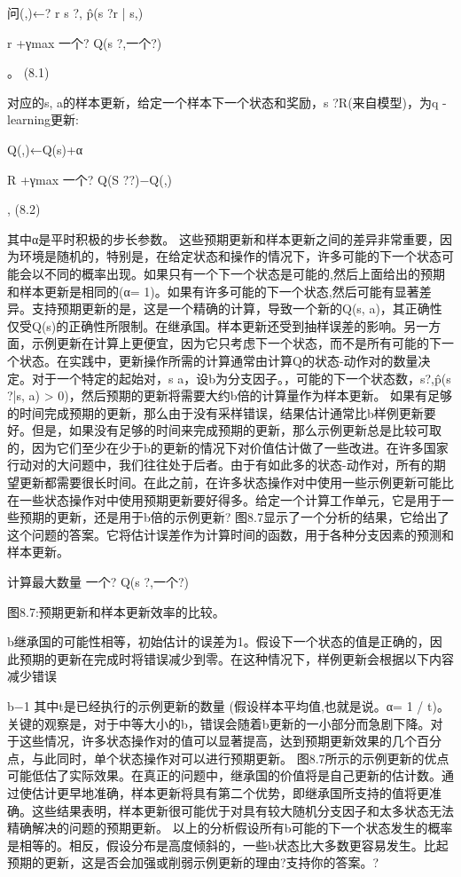 问(,)←?
r s ?,
p̂(s ?r | s,)

r +γmax
一个?
Q(s ?,一个?)

。 					(8.1)


对应的s, a的样本更新，给定一个样本下一个状态和奖励，s ?R(来自模型)，为q -learning更新:

Q(,)←Q(s)+α

R +γmax
一个?
Q(S ??)−Q(,)

, 					(8.2)

其中α是平时积极的步长参数。
这些预期更新和样本更新之间的差异非常重要，因为环境是随机的，特别是，在给定状态和操作的情况下，许多可能的下一个状态可能会以不同的概率出现。如果只有一个下一个状态是可能的,然后上面给出的预期和样本更新是相同的(α= 1)。如果有许多可能的下一个状态,然后可能有显著差异。支持预期更新的是，这是一个精确的计算，导致一个新的Q(s, a)，其正确性仅受Q(s)的正确性所限制。在继承国。样本更新还受到抽样误差的影响。另一方面，示例更新在计算上更便宜，因为它只考虑下一个状态，而不是所有可能的下一个状态。在实践中，更新操作所需的计算通常由计算Q的状态-动作对的数量决定。对于一个特定的起始对，s a，设b为分支因子。，可能的下一个状态数，s?,p̂(s ?|s, a) > 0)，然后预期的更新将需要大约b倍的计算量作为样本更新。
如果有足够的时间完成预期的更新，那么由于没有采样错误，结果估计通常比b样例更新要好。但是，如果没有足够的时间来完成预期的更新，那么示例更新总是比较可取的，因为它们至少在少于b的更新的情况下对价值估计做了一些改进。在许多国家行动对的大问题中，我们往往处于后者。由于有如此多的状态-动作对，所有的期望更新都需要很长时间。在此之前，在许多状态操作对中使用一些示例更新可能比在一些状态操作对中使用预期更新要好得多。给定一个计算工作单元，它是用于一些预期的更新，还是用于b倍的示例更新?
图8.7显示了一个分析的结果，它给出了这个问题的答案。它将估计误差作为计算时间的函数，用于各种分支因素的预测和样本更新。

计算最大数量
一个?
Q(s ?,一个?)

图8.7:预期更新和样本更新效率的比较。



b继承国的可能性相等，初始估计的误差为1。假设下一个状态的值是正确的，因此预期的更新在完成时将错误减少到零。在这种情况下，样例更新会根据以下内容减少错误

b−1
其中t是已经执行的示例更新的数量
(假设样本平均值,也就是说。α= 1 / t)。关键的观察是，对于中等大小的b，错误会随着b更新的一小部分而急剧下降。对于这些情况，许多状态操作对的值可以显著提高，达到预期更新效果的几个百分点，与此同时，单个状态操作对可以进行预期更新。
图8.7所示的示例更新的优点可能低估了实际效果。在真正的问题中，继承国的价值将是自己更新的估计数。通过使估计更早地准确，样本更新将具有第二个优势，即继承国所支持的值将更准确。这些结果表明，样本更新很可能优于对具有较大随机分支因子和太多状态无法精确解决的问题的预期更新。
以上的分析假设所有b可能的下一个状态发生的概率是相等的。相反，假设分布是高度倾斜的，一些b状态比大多数更容易发生。比起预期的更新，这是否会加强或削弱示例更新的理由?支持你的答案。?


